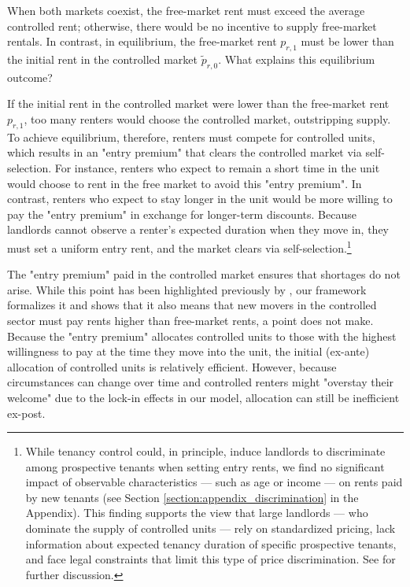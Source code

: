 \documentclass[parskip=full]{article}
\begin{document}
When both markets coexist, the free-market rent must exceed the average controlled rent; otherwise, there would be no incentive to supply free-market rentals. In contrast, in equilibrium, the free-market rent $p_{r,1}$ must be lower than the initial rent in the controlled market $\tilde{p}_{r,0}$. What explains this equilibrium outcome?

If the initial rent in the controlled market were lower than the free-market rent $p_{r,1}$, too many renters would choose the controlled market, outstripping supply. To achieve equilibrium, therefore, renters must compete for controlled units, which results in an "entry premium" that clears the controlled market via self-selection. For instance, renters who expect to remain a short time in the unit would choose to rent in the free market to avoid this "entry premium". In contrast, renters who expect to stay longer in the unit would be more willing to pay the "entry premium" in exchange for longer-term discounts. Because landlords cannot observe a renter's expected duration when they move in, they must set a uniform entry rent, and the market clears via self-selection.\footnote{While tenancy control could, in principle, induce landlords to discriminate among prospective tenants when setting entry rents, we find no significant impact of observable characteristics — such as age or income — on rents paid by new tenants (see Section \ref{section:appendix_discrimination} in the Appendix). This finding supports the view that large landlords — who dominate the supply of controlled units — rely on standardized pricing, lack information about expected tenancy duration of specific prospective tenants, and face legal constraints that limit this type of price discrimination. See \citet{be-2000} for further discussion.}

The "entry premium" paid in the controlled market ensures that shortages do not arise. While this point has been highlighted previously by \citet{arnott-1995}, our framework formalizes it and shows that it also means that new movers in the controlled sector must pay rents higher than free-market rents, a point \citet{arnott-1995} does not make. Because the "entry premium" allocates controlled units to those with the highest willingness to pay at the time they move into the unit, the initial (ex-ante) allocation of controlled units is relatively efficient. However, because circumstances can change over time and controlled renters might "overstay their welcome" due to the lock-in effects in our model, allocation can still be inefficient ex-post. 
\end{document}
